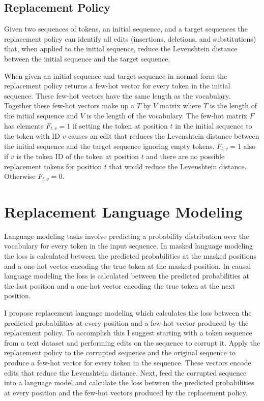 \documentclass{article}
\begin{document}
\subsection{Replacement Policy}
Given two sequences of tokens, an initial sequence, and a target sequences the replacement policy can identify all edits (insertions, deletions, and substitutions) that, when applied to the initial sequence, reduce the Levenshtein distance between the initial sequence and the target sequence.

When given an initial sequence and target sequence in normal form the replacement policy returns a few-hot vector for every token in the initial sequence. These few-hot vectors have the same length as the vocabulary. Together these few-hot vectors make up a $T$ by $V$ matrix where $T$ is the length of the initial sequence and $V$ is the length of the vocabulary. The few-hot matrix $F$ has elements $F_{t,v} = 1$ if setting the token at position $t$ in the initial sequence to the token with ID $v$ causes an edit that reduces the Levenshtein distance between the initial sequence and the target sequence ignoring empty tokens. $F_{t, v} = 1$ also if $v$ is the token ID of the token at position $t$ and there are no possible replacement tokens for position $t$ that would reduce the Levenshtein distance. Otherwise $F_{t,v} = 0$.

\section{Replacement Language Modeling}

Language modeling tasks involve predicting a probability distribution over the vocabulary for every token in the input sequence. In masked language modeling the loss is calculated between the predicted probabilities at the masked positions and a one-hot vector encoding the true token at the masked position. In causal language modeling the loss is calculated between the predicted probabilities at the last position and a one-hot vector encoding the true token at the next position.

I propose replacement language modeling which calculates the loss between the predicted probabilities at every position and a few-hot vector produced by the replacement policy. To accomplish this I suggest starting with a token sequence from a text dataset and performing edits on the sequence to corrupt it. Apply the replacement policy to the corrupted sequence and the original sequence to produce a few-hot vector for every token in the sequence. These vectors encode edits that reduce the Levenshtein distance. Next, feed the corrupted sequence into a language model and calculate the loss between the predicted probabilities at every position and the few-hot vectors produced by the replacement policy.
\end{document}
